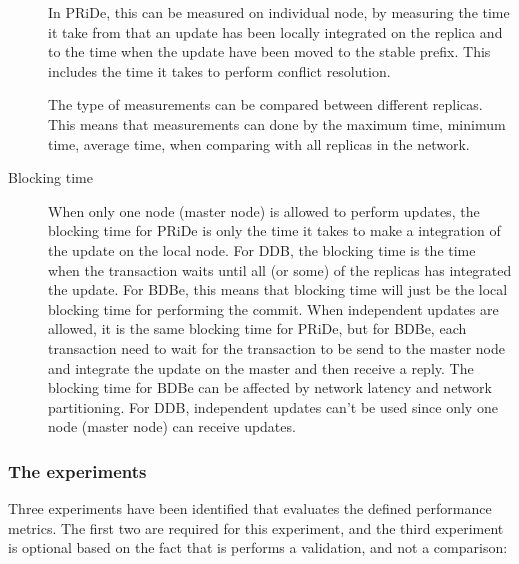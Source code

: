 \begin{description}
	In PRiDe, this can be measured on individual node, by measuring the time it take from that an update has been locally integrated on the replica and to the time when the update have been moved to the stable prefix. This includes the time it takes to perform conflict resolution. 

	The type of measurements can be compared between different replicas. This means that measurements can done by the maximum time, minimum time, average time, when comparing with all replicas in the network. 


	\item[Blocking time] 

	When only one node (master node) is allowed to perform updates, the blocking time for PRiDe is only the time it takes to make a integration of the update on the local node. For DDB, the blocking time is the time when the transaction waits until all (or some) of the replicas has integrated the update. For BDBe, this means that blocking time will just be the local blocking time for performing the commit.
	When independent updates are allowed, it is the same blocking time for PRiDe, but for BDBe, each transaction need to wait for the transaction to be send to the master node and integrate the update on the master and then receive a reply. The blocking time for BDBe can be affected by network latency and network partitioning. For DDB, independent updates can't be used since only one node (master node) can receive updates.

\end{description}


\subsubsection{The experiments} %
\label{ssub:the_experiments}

Three experiments have been identified that evaluates the defined performance metrics. The first two are required for this experiment, and the third experiment is optional based on the fact that is performs a validation, and not a comparison:


